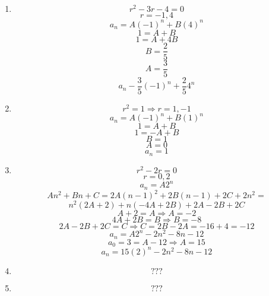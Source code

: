 \p
\begin{enumerate}
\item
$$r^2 - 3r - 4 = 0$$
$$r = -1, 4$$
$$a_n = A(-1)^n + B(4)^n$$
$$1 = A + B$$
$$1 = A + 4B$$
$$B = \frac{2}{5}$$
$$A = \frac{3}{5}$$
$$a_n - \frac{3}{5}(-1)^n + \frac{2}{5}4^n$$
\item
$$r^2 = 1 \Rightarrow r = 1, -1$$
$$a_n = A(-1)^n + B(1)^n$$
$$1 = A + B$$
$$1 = -A + B$$
$$B = 1$$
$$A = 0$$
$$a_n = 1$$
\item
$$r^2 - 2r = 0$$
$$r = 0, 2$$
$$a_n = A2^n$$
$$An^2 + Bn + C = 2A(n-1)^2 + 2B(n-1) + 2C + 2n^2 =$$
$$ n^2(2A + 2) + n(-4A+2B) + 2A - 2B + 2C$$
$$A + 2 = A \Rightarrow A = -2$$
$$4A + 2B = B \Rightarrow B = -8$$
$$2A - 2B + 2C = C \Rightarrow C = 2B - 2A = -16 + 4 = -12$$
$$a_n = A2^n - 2n^2 - 8n - 12$$
$$a_0 = 3 = A - 12 \Rightarrow A = 15$$
$$a_n = 15(2)^n - 2n^2 - 8n - 12$$
\item
$$???$$
\item
$$???$$
\end{enumerate}

